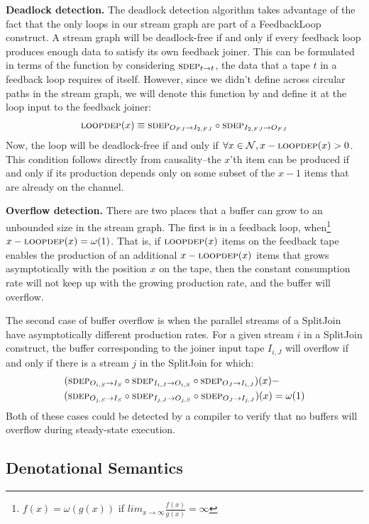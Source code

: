 {\bf Deadlock detection.}  The deadlock detection algorithm takes
advantage of the fact that the only loops in our stream graph are part
of a FeedbackLoop construct.  A stream graph will be deadlock-free if
and only if every feedback loop produces enough data to satisfy its
own feedback joiner.  This can be formulated in terms of the \sdep
function by considering $\mi{t}{t}$, the data that a tape $t$ in a
feedback loop requires of itself.  However, since we didn't define
\sdep across circular paths in the stream graph, we will denote this
function by \loopdep and define it at the loop input to the feedback
joiner:
\begin{align*}
\loopdep(x) \equiv \mi{I_{2,FJ}}{O_{FJ}} \circ \mi{O_{FJ}}{I_{2,FJ}}
\end{align*}
Now, the loop will be deadlock-free if and only if $\forall x \in
\mathcal{N}, x - \textsc{loopdep}(x) > 0$.  This condition follows directly
from causality--the $x$'th item can be produced if and only if its
production depends only on some subset of the $x-1$ items that are
already on the channel.

{\bf Overflow detection.}  There are two places that a buffer can grow
to an unbounded size in the stream graph.  The first is in a feedback
loop, when\footnote{$f(x) = \omega(g(x))$ if $lim_{x \rightarrow
\infty}\frac{f(x)}{g(x)} = \infty$}~$x - \textsc{loopdep}(x) = \omega(1)$.
That is, if $\textsc{loopdep}(x)$ items on the feedback tape enables the
production of an additional $x - \textsc{loopdep}(x)$ items that grows
asymptotically with the position $x$ on the tape, then the constant
consumption rate will not keep up with the growing production rate,
and the buffer will overflow.

The second case of buffer overflow is when the parallel streams of a
SplitJoin have asymptotically different production rates.  For a given
stream $i$ in a SplitJoin construct, the buffer corresponding to the
joiner input tape $I_{i,J}$ will overflow if and only if there is a
stream $j$ in the SplitJoin for which:
\begin{align*}
(\mi{I_S}{O_{i,S}}& \circ \mi{O_{i,S}}{I_{i,J}} \circ \mi{I_{i,J}}{O_J})(x) - \\
(\mi{I_S}{O_{j,S}}& \circ \mi{O_{j,S}}{I_{j,J}} \circ \mi{I_{j,J}}{O_J})(x) = \omega(1)
\end{align*}
Both of these cases could be detected by a compiler to verify that no
buffers will overflow during steady-state execution.

\subsection{Denotational Semantics}
\label{sec:denotational}

